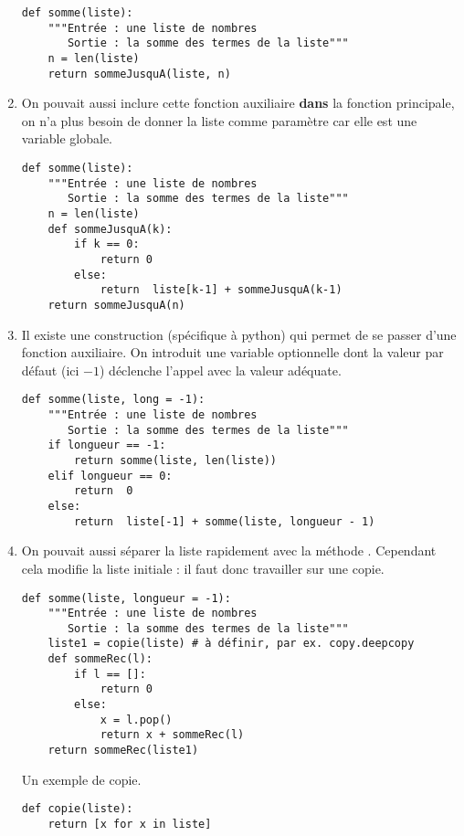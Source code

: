 \begin{Answer}
\begin{enumerate}
\begin{lstlisting}
def somme(liste):
    """Entrée : une liste de nombres
       Sortie : la somme des termes de la liste"""
    n = len(liste)
    return sommeJusquA(liste, n)
\end{lstlisting}
\item On pouvait aussi inclure cette fonction auxiliaire {\bf dans} la fonction principale, on n'a plus besoin de donner la liste comme paramètre car elle est une variable globale.
\begin{lstlisting}
def somme(liste):
    """Entrée : une liste de nombres
       Sortie : la somme des termes de la liste"""
    n = len(liste)
    def sommeJusquA(k):
        if k == 0:
            return 0
        else:
            return  liste[k-1] + sommeJusquA(k-1)
    return sommeJusquA(n)
\end{lstlisting}
\item Il existe une construction (spécifique à python) qui permet de se passer d'une fonction auxiliaire. On introduit une variable optionnelle dont la valeur par défaut (ici $-1$) déclenche l'appel avec la valeur adéquate.
\begin{lstlisting}
def somme(liste, long = -1):
    """Entrée : une liste de nombres
       Sortie : la somme des termes de la liste"""
    if longueur == -1:
        return somme(liste, len(liste))
    elif longueur == 0:
        return  0
    else:
        return  liste[-1] + somme(liste, longueur - 1)
\end{lstlisting}
\newpage
\item On pouvait aussi séparer la liste rapidement avec la méthode . Cependant cela modifie la liste initiale : il faut donc travailler sur une copie.
\begin{lstlisting}
def somme(liste, longueur = -1):
    """Entrée : une liste de nombres
       Sortie : la somme des termes de la liste"""
    liste1 = copie(liste) # à définir, par ex. copy.deepcopy
    def sommeRec(l):
        if l == []:
            return 0
        else:
            x = l.pop()
            return x + sommeRec(l)
    return sommeRec(liste1)
\end{lstlisting}
Un exemple de copie.
\begin{lstlisting}
def copie(liste):
    return [x for x in liste]
\end{lstlisting}
\end{enumerate}
\end{Answer}
